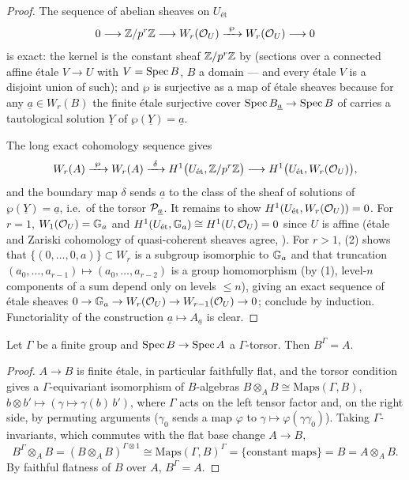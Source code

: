 \documentclass[11pt]{article}
\newcommand{\wv}[1]{\underline{#1}}                 %
\begin{document}
\begin{proof}
The sequence of abelian sheaves on $U_{\text{\'et}}$
\[
0\longrightarrow \mathbb{Z}/p^r\mathbb{Z}\longrightarrow W_r(\mathcal{O}_U)
\xrightarrow{\ \wp\ } W_r(\mathcal{O}_U)\longrightarrow 0
\]
is exact: the kernel is the constant sheaf $\mathbb{Z}/p^r\mathbb{Z}$ by
 (sections over a connected affine \'etale $V\to U$ with
$V=\operatorname{Spec} B$, $B$ a domain --- and every \'etale $V$ is a disjoint union of
such); and $\wp$ is surjective as a map of \'etale sheaves because for any
$\wv a\in W_r(B)$ the finite \'etale surjective cover
$\Spec B_{\wv a}\to\Spec B$ of  carries a tautological
solution $\wv Y$ of $\wp(\wv Y)=\wv a$.

The long exact cohomology sequence gives
\[
W_r(A)\xrightarrow{\ \wp\ }W_r(A)\xrightarrow{\ \delta\ }
H^1\big(U_{\text{\'et}},\Z/p^r\Z\big)\longrightarrow
H^1\big(U_{\text{\'et}},W_r(\Oo_U)\big),
\]
and the boundary map $\delta$ sends $\wv a$ to the class of the sheaf of
solutions of $\wp(\wv Y)=\wv a$, i.e.\ of the torsor $\cP_{\wv a}$.
It remains to show $H^1(U_{\text{\'et}},W_r(\mathcal{O}_U))=0$.  For $r=1$,
$W_1(\mathcal{O}_U)=\mathbb{G}_a$ and
$H^1(U_{\text{\'et}},\mathbb{G}_a)\cong H^1(U,\mathcal{O}_U)=0$ since $U$ is affine
(\'etale and Zariski cohomology of quasi-coherent sheaves agree,
\cite[III \S3]{milneEC}).  For $r>1$, (2) shows that
$\{(0,\dots,0,a)\}\subset W_r$ is a subgroup isomorphic to $\mathbb{G}_a$ and that
truncation $(a_0,\dots,a_{r-1})\mapsto(a_0,\dots,a_{r-2})$ is a group
homomorphism (by (1), level-$n$ components of a sum
depend only on levels $\le n$), giving an exact sequence of \'etale sheaves
$0\to\mathbb{G}_a\to W_r(\mathcal{O}_U)\to W_{r-1}(\mathcal{O}_U)\to 0$; conclude by induction.
Functoriality of the construction $\wv a\mapsto A_{\wv a}$ is clear.
\end{proof}

\begin{lemma}\label{lem:torsor-invariants}
Let $\Gamma$ be a finite group and $\operatorname{Spec} B\to\operatorname{Spec} A$ a $\Gamma$-torsor.
Then $B^{\Gamma}=A$.
\end{lemma}

\begin{proof}
$A\to B$ is finite \'etale, in particular faithfully flat, and the torsor
condition gives a $\Gamma$-equivariant isomorphism of $B$-algebras
$B\otimes_AB\cong\mathrm{Maps}(\Gamma,B)$,
$b\otimes b'\mapsto(\gamma\mapsto\gamma(b)\,b')$, where $\Gamma$ acts on
the left tensor factor and, on the right side, by permuting arguments
($\gamma_0$ sends a map $\varphi$ to $\gamma\mapsto\varphi(\gamma\gamma_0)$).
Taking $\Gamma$-invariants, which commutes with the flat base change
$A\to B$,
\[
B^\Gamma\otimes_AB=(B\otimes_AB)^{\Gamma\otimes 1}
\cong\mathrm{Maps}(\Gamma,B)^{\Gamma}=\{\text{constant maps}\}=B
=A\otimes_AB .
\]
By faithful flatness of $B$ over $A$, $B^\Gamma=A$.
\end{proof}
\end{document}
